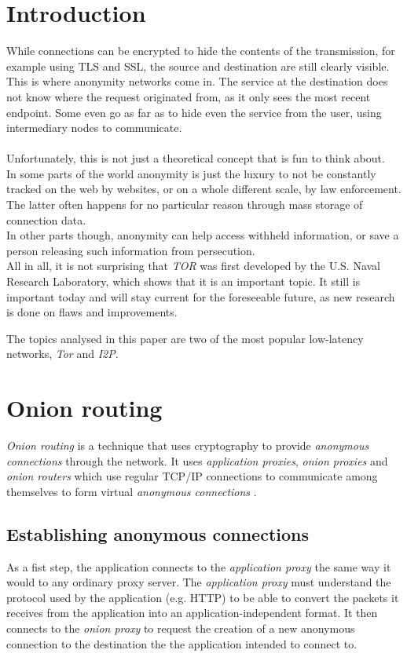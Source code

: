 \documentclass{sig-alternate}
\begin{document}
\section{Introduction}
While connections can be encrypted to hide the contents of the transmission, for example using TLS and SSL, the source and destination are still clearly visible.
\\
This is where anonymity networks come in.
The service at the destination does not know where the request originated from, as it only sees the most recent endpoint.
Some even go as far as to hide even the service from the user, using intermediary nodes to communicate.
\\
\\
Unfortunately, this is not just a theoretical concept that is fun to think about.
\\
In some parts of the world anonymity is just the luxury to not be constantly tracked on the web by websites, or on a whole different scale, by law enforcement.
The latter often happens for no particular reason through mass storage of connection data.
\\
In other parts though, anonymity can help access withheld information, or save a person releasing such information from persecution.
\\
All in all, it is not surprising that \emph{TOR} was first developed by the U.S. Naval Research Laboratory, which shows that it is an important topic.
It still is important today and will stay current for the foreseeable future, as new research is done on flaws and improvements\cite{craven2010}.

The topics analysed in this paper are two of the most popular low-latency networks, \emph{Tor} and \emph{I2P}.

\section{Onion routing}
\emph{Onion routing} is a technique that uses cryptography to provide \emph{anonymous connections}
through the network. It uses \emph{application proxies}, \emph{onion proxies} and
\emph{onion routers} which use regular TCP/IP connections to communicate among themselves
to form virtual \emph{anonymous connections} \cite{reed1998}.

\subsection{Establishing anonymous connections}
As a fist step, the application connects to the \emph{application proxy} the same way it would to
any ordinary proxy server. The \emph{application proxy} must understand the protocol used by the
application (e.g. HTTP) to be able to convert the packets it receives from the application into an
application-independent format. It then connects to the \emph{onion proxy} to request the
creation of a new anonymous connection to the destination the the application intended to connect to.
\end{document}
